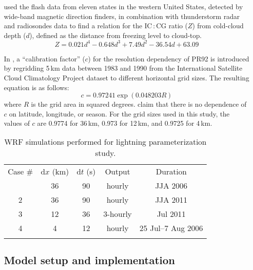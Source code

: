 \citet{Price:1993fk} used the flash data from eleven states in the western
United States, detected by wide-band magnetic direction finders, in
combination with thunderstorm radar and radiosondes data to find a relation
for the IC\,:\,CG ratio ($Z$) from cold-cloud depth ($d$), defined as the
distance from freezing level to cloud-top.
\begin{equation}\label{eq:Z}
Z = 0.021d^4-0.648d^3+7.49d^2-36.54d + 63.09
\end{equation}

In \citet{Price:1994fk}, a ``calibration factor'' ($c$) for the resolution
dependency of PR92 is introduced by regridding 5\,\unit{km} data between 1983
and 1990 from the International Satellite Cloud Climatology Project dataset
\citep[ISCCP;][]{Rossow:1991aa} to different horizontal grid sizes. The
resulting equation is as follows:
      \begin{equation}\label{eq:calib}
            c = 0.97241\exp(0.048203R)
      \end{equation}
where $R$ is the grid area in squared degrees. \citet{Price:1994fk} claim
that there is no dependence of $c$ on latitude, longitude, or season. For the
grid sizes used in this study, the values of $c$ are 0.9774 for
36\,\unit{km}, 0.973 for 12\,\unit{km}, and 0.9725 for 4\,\unit{km}.

\begin{table}[t]
\caption{WRF simulations performed for lightning parameterization study.}
\begin{tabular}{ccccc} \tophline
Case \# & d$x$ (km) & d$t$ (\unit{s}) & Output &
Duration \\
\middlehline
1 & 36 & 90 & hourly & JJA 2006 \\
2 & 36 & 90 & hourly & JJA 2011 \\
3 & 12 & 36 & 3-hourly &Jul 2011 \\
4 & 4 & 12 & hourly &25 Jul--7 Aug 2006 \\
\bottomhline
\end{tabular}
\label{tab:lightning/setup}
\end{table}

\subsection{Model setup and implementation}\label{ssec:lightning/model}

